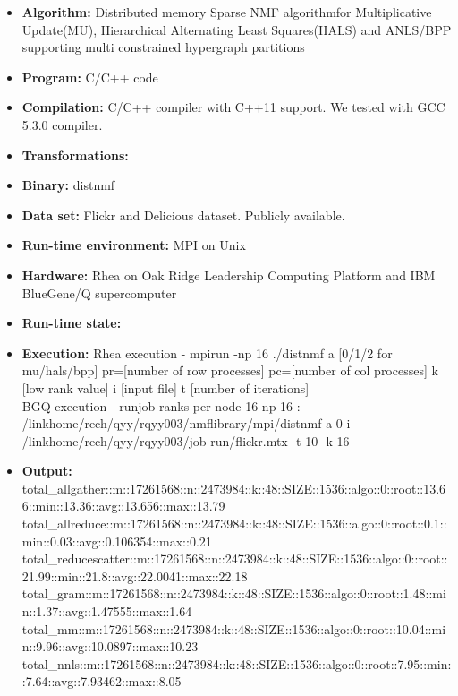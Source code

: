 \documentclass[sigconf, review=false]{acmart}
\newcommand{\distspnmffull}{Distributed memory Sparse NMF algorithm}
\begin{document}
{\small
\begin{itemize}
  \item {\bf Algorithm: } \distspnmffull for Multiplicative Update(MU), Hierarchical Alternating Least Squares(HALS) and ANLS/BPP supporting multi constrained hypergraph partitions 
  \item {\bf Program: } C/C++ code
  \item {\bf Compilation: } C/C++ compiler with C++11 support. We tested with GCC 5.3.0 compiler. 
  \item {\bf Transformations: }
  \item {\bf Binary: } distnmf
  \item {\bf Data set: } Flickr and Delicious dataset. Publicly available. 
  \item {\bf Run-time environment: } MPI on Unix
  \item {\bf Hardware: } Rhea on Oak Ridge Leadership Computing Platform and IBM BlueGene/Q supercomputer
  \item {\bf Run-time state: } 
  \item {\bf Execution: } Rhea execution - mpirun -np 16 ./distnmf \-a [0/1/2 for mu/hals/bpp] \-\-pr=[number of row processes] \-\-pc=[number of col processes] \-k [low rank value] \-i [input file] \-t [number of iterations] \\
BGQ execution -  runjob \-\-ranks-per-node 16 \-\-np 16 : /linkhome/rech/qyy/rqyy003/nmflibrary/mpi/distnmf \-a 0 \-i /linkhome/rech/qyy/rqyy003/job-run/flickr.mtx -t 10 -k 16 \\
  \item {\bf Output: }
total\_allgather::m::17261568::n::2473984::k::48::SIZE::1536::algo::0::root::13.66::min::13.36::avg::13.656::max::13.79 \\
total\_allreduce::m::17261568::n::2473984::k::48::SIZE::1536::algo::0::root::0.1::min::0.03::avg::0.106354::max::0.21 \\
total\_reducescatter::m::17261568::n::2473984::k::48::SIZE::1536::algo::0::root::21.99::min::21.8::avg::22.0041::max::22.18 \\
total\_gram::m::17261568::n::2473984::k::48::SIZE::1536::algo::0::root::1.48::min::1.37::avg::1.47555::max::1.64 \\
total\_mm::m::17261568::n::2473984::k::48::SIZE::1536::algo::0::root::10.04::min::9.96::avg::10.0897::max::10.23 \\
total\_nnls::m::17261568::n::2473984::k::48::SIZE::1536::algo::0::root::7.95::min::7.64::avg::7.93462::max::8.05 \\

\end{itemize}}
\end{document}
